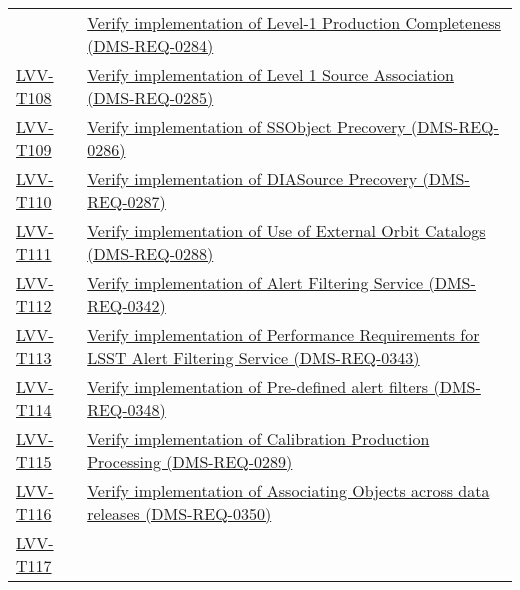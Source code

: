\begin{longtable}[]{@{}ll@{}}
&
\href{https://jira.lsstcorp.org/secure/Tests.jspa\#/testCase/LVV-T107}{Verify
implementation of Level-1 Production Completeness
(DMS-REQ-0284)}\tabularnewline
\protect\hyperlink{lvv-t108---verify-implementation-of-level-1-source-association-dms-req-0285}{LVV-T108}
&
\href{https://jira.lsstcorp.org/secure/Tests.jspa\#/testCase/LVV-T108}{Verify
implementation of Level 1 Source Association
(DMS-REQ-0285)}\tabularnewline
\protect\hyperlink{lvv-t109---verify-implementation-of-ssobject-precovery-dms-req-0286}{LVV-T109}
&
\href{https://jira.lsstcorp.org/secure/Tests.jspa\#/testCase/LVV-T109}{Verify
implementation of SSObject Precovery (DMS-REQ-0286)}\tabularnewline
\protect\hyperlink{lvv-t110---verify-implementation-of-diasource-precovery-dms-req-0287}{LVV-T110}
&
\href{https://jira.lsstcorp.org/secure/Tests.jspa\#/testCase/LVV-T110}{Verify
implementation of DIASource Precovery (DMS-REQ-0287)}\tabularnewline
\protect\hyperlink{lvv-t111---verify-implementation-of-use-of-external-orbit-catalogs-dms-req-0288}{LVV-T111}
&
\href{https://jira.lsstcorp.org/secure/Tests.jspa\#/testCase/LVV-T111}{Verify
implementation of Use of External Orbit Catalogs
(DMS-REQ-0288)}\tabularnewline
\protect\hyperlink{lvv-t112---verify-implementation-of-alert-filtering-service-dms-req-0342}{LVV-T112}
&
\href{https://jira.lsstcorp.org/secure/Tests.jspa\#/testCase/LVV-T112}{Verify
implementation of Alert Filtering Service (DMS-REQ-0342)}\tabularnewline
\protect\hyperlink{lvv-t113---verify-implementation-of-performance-requirements-for-lsst-alert-filtering-service--dms-req-0343}{LVV-T113}
&
\href{https://jira.lsstcorp.org/secure/Tests.jspa\#/testCase/LVV-T113}{Verify
implementation of Performance Requirements for LSST Alert Filtering
Service (DMS-REQ-0343)}\tabularnewline
\protect\hyperlink{lvv-t114---verify-implementation-of-pre-defined-alert-filters-dms-req-0348}{LVV-T114}
&
\href{https://jira.lsstcorp.org/secure/Tests.jspa\#/testCase/LVV-T114}{Verify
implementation of Pre-defined alert filters
(DMS-REQ-0348)}\tabularnewline
\protect\hyperlink{lvv-t115---verify-implementation-of-calibration-production-processing-dms-req-0289}{LVV-T115}
&
\href{https://jira.lsstcorp.org/secure/Tests.jspa\#/testCase/LVV-T115}{Verify
implementation of Calibration Production Processing
(DMS-REQ-0289)}\tabularnewline
\protect\hyperlink{lvv-t116---verify-implementation-of-associating-objects-across-data-releases-dms-req-0350}{LVV-T116}
&
\href{https://jira.lsstcorp.org/secure/Tests.jspa\#/testCase/LVV-T116}{Verify
implementation of Associating Objects across data releases
(DMS-REQ-0350)}\tabularnewline
\protect\hyperlink{lvv-t117---verify-implementation-of--dac-resource-allocation-for-level-3-processing-dms-req-0119}{LVV-T117}

\end{longtable}
